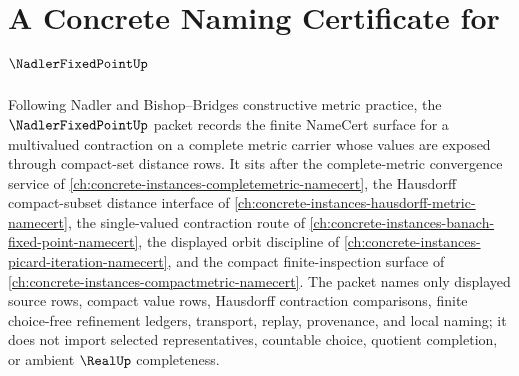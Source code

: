 \chapter{A Concrete Naming Certificate for $\NadlerFixedPointUp$}
\label{ch:concrete-instances-nadler-fixed-point-namecert}

Following Nadler and Bishop--Bridges constructive metric practice, the $\NadlerFixedPointUp$ packet records the finite NameCert surface for a multivalued contraction on a complete metric carrier whose values are exposed through compact-set distance rows. It sits after the complete-metric convergence service of \autoref{ch:concrete-instances-completemetric-namecert}, the Hausdorff compact-subset distance interface of \autoref{ch:concrete-instances-hausdorff-metric-namecert}, the single-valued contraction route of \autoref{ch:concrete-instances-banach-fixed-point-namecert}, the displayed orbit discipline of \autoref{ch:concrete-instances-picard-iteration-namecert}, and the compact finite-inspection surface of \autoref{ch:concrete-instances-compactmetric-namecert}. The packet names only displayed source rows, compact value rows, Hausdorff contraction comparisons, finite choice-free refinement ledgers, transport, replay, provenance, and local naming; it does not import selected representatives, countable choice, quotient completion, or ambient $\RealUp$ completeness.

